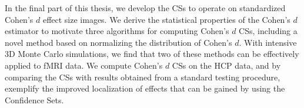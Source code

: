 \documentclass[11pt,a4paper]{report}      %
\begin{document}
\begin{thesisabstract}
\begin{singlespace}
In the final part of this thesis, we develop the CSs to operate on standardized Cohen's $d$ effect size images. We derive the statistical properties of the Cohen's $d$ estimator to motivate three algorithms for computing Cohen's $d$ CSs, including a novel method based on normalizing the distribution of Cohen's $d$. With intensive 3D Monte Carlo simulations, we find that two of these methods can be effectively applied to fMRI data. We compute Cohen's $d$ CSs on the HCP data, and by comparing the CSs with results obtained from a standard testing procedure, exemplify the improved localization of effects that can be gained by using the Confidence Sets. 

\end{singlespace}
\end{thesisabstract}
\end{document}
